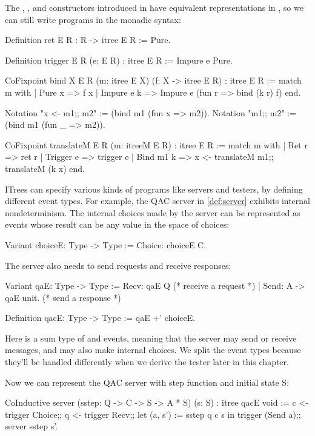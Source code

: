 The , , and  constructors introduced in
 have equivalent representations in , so we can still
write programs in the monadic syntax:
\begin{coq}
  Definition ret {E R} : R -> itree E R := Pure.
  
  Definition trigger {E R} (e: E R) : itree E R := Impure e Pure.

  CoFixpoint bind {X E R} (m: itree E X) (f: X -> itree E R) : itree E R :=
    match m with
    | Pure   x   => f x
    | Impure e k => Impure e (fun r => bind (k r) f)
    end.

  Notation "x <- m1;; m2" := (bind m1 (fun x => m2)).
  Notation "m1;; m2"      := (bind m1 (fun _ => m2)).

  CoFixpoint translateM {E R} (m: itreeM E R) : itree E R :=
    match m with
    | Ret     r => ret r
    | Trigger e => trigger e
    | Bind m1 k => x <- translateM m1;; translateM (k x)
    end.
\end{coq}

ITrees can specify various kinds of programs like servers and testers, by
defining different event types.  For example, the QAC server in
\autoref{def:server} exhibits internal nondeterminism.  The internal choices
made by the server can be represented as  events whose result can be
any value in the space of choices:
\begin{coq}
  Variant choiceE: Type -> Type :=
    Choice: choiceE C.
\end{coq}

The server also needs to send requests and receive responses:
\begin{coq}
  Variant qaE: Type -> Type :=
    Recv: qaE Q           (* receive a request *)
  | Send: A -> qaE unit.  (* send a response   *)

  Definition qacE: Type -> Type := qaE +' choiceE.
\end{coq}

Here  is a sum type of  and  events, meaning
that the server may send or receive messages, and may also make internal
choices.  We split the event types because they'll be handled differently when
we derive the tester later in this chapter.

Now we can represent the QAC server with step function  and initial
state \ilc S:
\begin{coq}
  CoInductive server (sstep: Q -> C -> S -> A * S) (s: S)
              : itree qacE void :=
    c <- trigger Choice;;
    q <- trigger Recv;;
    let (a, s') := sstep q c s in
    trigger (Send a);;
    server sstep s'.
\end{coq}

